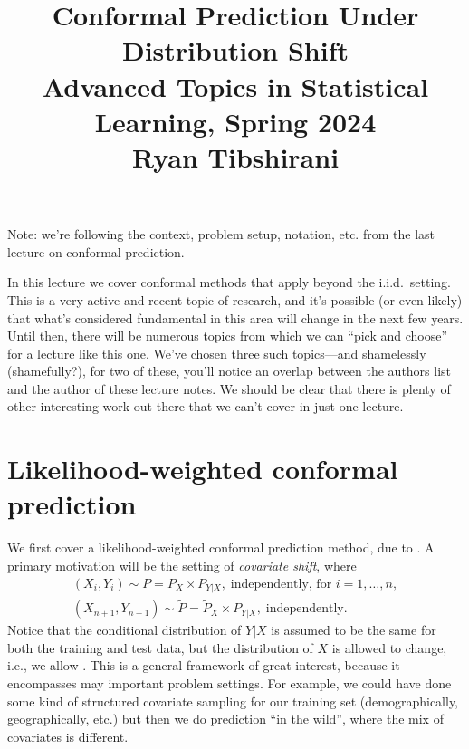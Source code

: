 \documentclass{article}
\title{Conformal Prediction Under Distribution Shift \\ \smallskip
\large Advanced Topics in Statistical Learning, Spring 2024 \\ \smallskip
Ryan Tibshirani }
\date{}
\begin{document}
\maketitle
\RaggedRight
\vspace{-50pt}

Note: we're following the context, problem setup, notation, etc. from the last
lecture on conformal prediction.

In this lecture we cover conformal methods that apply beyond the i.i.d.\
setting. This is a very active and recent topic of research, and it's possible
(or even likely) that what's considered fundamental in this area will change in
the next few years. Until then, there will be numerous topics from which we can
``pick and choose'' for a lecture like this one. We've chosen three such
topics---and shamelessly (shamefully?), for two of these, you'll notice an 
overlap between the authors list and the author of these lecture notes. We
should be clear that there is plenty of other interesting work out there that we
can't cover in just one lecture. 

\section{Likelihood-weighted conformal prediction}

\def\tP{\tilde{P}}

We first cover a likelihood-weighted conformal prediction method, due to
\citet{tibshirani2019conformal}. A primary motivation will be the setting of  
\emph{covariate shift}, where 
\begin{equation}
\label{eq:cov_shift}
\begin{gathered}
(X_i, Y_i) \sim P = P_X \times P_{Y|X}, \; \text{independently, for
  $i=1,\dots,n$}, \\ 
(X_{n+1}, Y_{n+1}) \sim \tP = \tP_X \times P_{Y|X}, \; \text{independently}. 
\end{gathered}
\end{equation}
Notice that the conditional distribution of $Y|X$ is assumed to be the same for
both the training and test data, but the distribution of $X$ is allowed to
change, i.e., we allow \smash{$\tP_X \not= P_X$}. This is a general framework of
great interest, because it encompasses may important problem settings. For
example, we could have done some kind of structured covariate sampling for our
training set (demographically, geographically, etc.) but then we do prediction
``in the wild'', where the mix of covariates is different.
\end{document}
